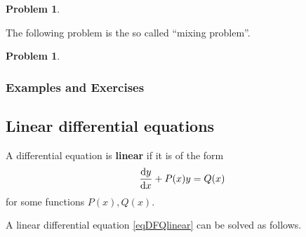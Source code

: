 \documentclass[12pt]{book}
\newtheorem{problem}[theorem]{Problem}
\renewcommand{\emph}{\textbf}
\newcommand{\additionalProblemLabel}{}
\begin{document}
\begin{problem}~\label{problemDFQseparable-yprime=ysquared-1}

\end{problem}
\renewcommand{\additionalProblemLabel}{\ref{problemDFQseparable-yprime=ysquared-1}.}

\renewcommand{\additionalProblemLabel}{}

The following problem is the so called ``mixing problem''.
\begin{problem}

\end{problem}


\subsubsection{Examples and Exercises}

\subsection{Linear differential equations}
A differential equation is \emph{linear} if it is of the form
\begin{equation}\label{eqDFQlinear}
\frac{{\normalfont \text{d}} y}{{\normalfont \text{d}} x} + P(x)y=Q(x)
\end{equation}
for some functions $P(x),Q(x)$.

A linear differential equation \eqref{eqDFQlinear} can be solved as follows.
\end{document}
